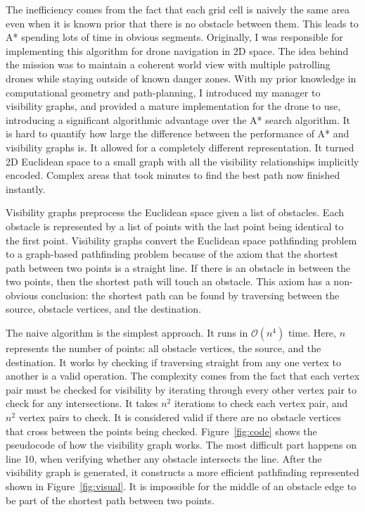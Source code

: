 The inefficiency comes from the fact that each grid cell is naively the same area even when it is known prior that there is no obstacle between them. This leads to A* spending lots of time in obvious segments. Originally, I was responsible for implementing this algorithm for drone navigation in 2D space. The idea behind the mission was to maintain a coherent world view with multiple patrolling drones while staying outside of known danger zones. With my prior knowledge in computational geometry and path-planning, I introduced my manager to visibility graphs, and provided a mature implementation for the drone to use, introducing a significant algorithmic advantage over the A* search algorithm. It is hard to quantify how large the difference between the performance of A* and visibility graphs is. It allowed for a completely different representation. It turned 2D Euclidean space to a small graph with all the visibility relationships implicitly encoded. Complex areas that took minutes to find the best path now finished instantly.

Visibility graphs preprocess the Euclidean space given a list of obstacles. \cite{lozano1979algorithm} Each obstacle is represented by a list of points with the last point being identical to the first point. Visibility graphs convert the Euclidean space pathfinding problem to a graph-based pathfinding problem because of the axiom that the shortest path between two points is a straight line. If there is an obstacle in between the two points, then the shortest path will touch an obstacle. This axiom has a non-obvious conclusion: the shortest path can be found by traversing between the source, obstacle vertices, and the destination.

The naive algorithm is the simplest approach. It runs in $\mathcal{O}(n^4)$ time. Here, $n$ represents the number of points: all obstacle vertices, the source, and the destination. It works by checking if traversing straight from any one vertex to another is a valid operation. The complexity comes from the fact that each vertex pair must be checked for visibility by iterating through every other vertex pair to check for any intersections. It takes $n^2$ iterations to check each vertex pair, and $n^2$ vertex pairs to check. It is considered valid if there are no obstacle vertices that cross between the points being checked. Figure~\ref{fig:code} shows the pseudocode of how the visibility graph works. The most difficult part happens on line 10, when verifying whether any obstacle intersects the line. After the visibility graph is generated, it constructs a more efficient pathfinding represented shown in Figure~\ref{fig:visual}. It is impossible for the middle of an obstacle edge to be part of the shortest path between two points.

